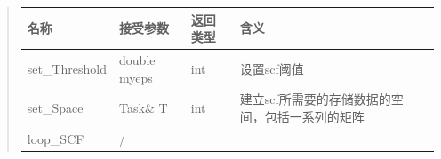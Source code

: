 \documentclass[11pt]{article}
\begin{document}
\begin{quote}
\begin{longtable}[]{@{}llll@{}}
\toprule
\begin{minipage}[b]{0.15\columnwidth}\raggedright\strut
名称\strut
\end{minipage} & \begin{minipage}[b]{0.14\columnwidth}\raggedright\strut
接受参数\strut
\end{minipage} & \begin{minipage}[b]{0.09\columnwidth}\raggedright\strut
返回类型\strut
\end{minipage} & \begin{minipage}[b]{0.51\columnwidth}\raggedright\strut
含义\strut
\end{minipage}\tabularnewline
\midrule
\endhead
\begin{minipage}[t]{0.15\columnwidth}\raggedright\strut
set\_Threshold\strut
\end{minipage} & \begin{minipage}[t]{0.14\columnwidth}\raggedright\strut
double myeps\strut
\end{minipage} & \begin{minipage}[t]{0.09\columnwidth}\raggedright\strut
int\strut
\end{minipage} & \begin{minipage}[t]{0.51\columnwidth}\raggedright\strut
设置scf阈值\strut
\end{minipage}\tabularnewline
\begin{minipage}[t]{0.15\columnwidth}\raggedright\strut
set\_Space\strut
\end{minipage} & \begin{minipage}[t]{0.14\columnwidth}\raggedright\strut
Task\& T\strut
\end{minipage} & \begin{minipage}[t]{0.09\columnwidth}\raggedright\strut
int\strut
\end{minipage} & \begin{minipage}[t]{0.51\columnwidth}\raggedright\strut
建立scf所需要的存储数据的空间，包括一系列的矩阵\strut
\end{minipage}\tabularnewline
\begin{minipage}[t]{0.15\columnwidth}\raggedright\strut
loop\_SCF\strut
\end{minipage} & \begin{minipage}[t]{0.14\columnwidth}\raggedright\strut
/\strut
\end{minipage} & \begin{minipage}[t]{0.09\columnwidth}\raggedright\strut

\end{minipage}
\end{longtable}
\end{quote}
\end{document}
